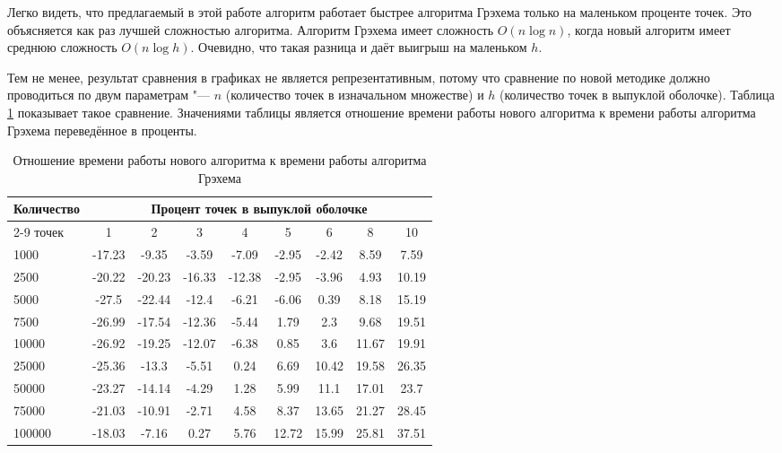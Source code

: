 Легко видеть, что предлагаемый в этой работе алгоритм работает быстрее алгоритма Грэхема только на маленьком проценте точек. Это объясняется как раз лучшей сложностью алгоритма. Алгоритм Грэхема имеет сложность $O(n \log n)$, когда новый алгоритм имеет среднюю сложность $O(n \log h)$. Очевидно, что такая разница и даёт выигрыш на маленьком $h$.

Тем не менее, результат сравнения в графиках не является репрезентативным, потому что сравнение по новой методике должно проводиться по двум параметрам "--- $n$ (количество точек в изначальном множестве) и $h$ (количество точек в выпуклой оболочке). Таблица \ref{table:ratio} показывает такое сравнение. Значениями таблицы является отношение времени работы нового алгоритма к времени работы алгоритма Грэхема переведённое в проценты.


\begin{table}[hbt]
	\centering
	\caption{Отношение времени работы нового алгоритма к времени работы алгоритма Грэхема}
	\label{table:ratio}
	\begin{tabular}{|l|c|c|c|c|c|c|c|c|}
\hline
\multirow{2}{*}{Количество} & \multicolumn{8}{c|}{Процент точек в выпуклой оболочке} \\ \cline{2-9}
точек& 1 & 2 & 3 & 4 & 5 & 6 & 8 & 10 \\ \hline
1000  &  -17.23 & -9.35  & -3.59  & -7.09  & -2.95 & -2.42 &  8.59 & 7.59  \\ \hline
2500  &  -20.22 & -20.23 & -16.33 & -12.38 & -2.95 & -3.96 &  4.93 & 10.19 \\ \hline
5000  &  -27.5  & -22.44 & -12.4  & -6.21  & -6.06 &  0.39 &  8.18 & 15.19 \\ \hline
7500  &  -26.99 & -17.54 & -12.36 & -5.44  &  1.79 &  2.3  &  9.68 & 19.51 \\ \hline
10000 &  -26.92 & -19.25 & -12.07 & -6.38  &  0.85 &  3.6  & 11.67 & 19.91 \\ \hline
25000 &  -25.36 & -13.3  & -5.51  &  0.24  &  6.69 & 10.42 & 19.58 & 26.35 \\ \hline
50000 &  -23.27 & -14.14 & -4.29  &  1.28  &  5.99 & 11.1  & 17.01 & 23.7  \\ \hline
75000 &  -21.03 & -10.91 & -2.71  &  4.58  &  8.37 & 13.65 & 21.27 & 28.45 \\ \hline
100000&  -18.03 & -7.16  &  0.27  &  5.76  & 12.72 & 15.99 & 25.81 & 37.51 \\ \hline
	\end{tabular}
\end{table}

